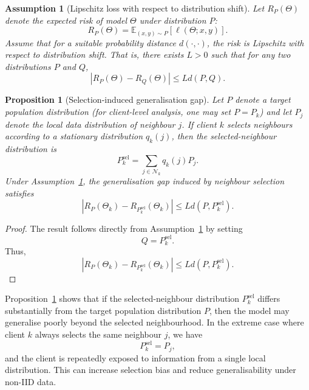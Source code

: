\documentclass[conference]{IEEEtran}
\newcommand{\rev}[1]{{\color{red}#1}}
\newtheorem{assumption}{Assumption}
\newtheorem{proposition}{Proposition}
\begin{document}
\begin{assumption}[Lipschitz loss with respect to distribution shift]
\label{ass:lipschitz_distribution}
Let $R_P(\Theta)$ denote the expected risk of model $\Theta$ under distribution $P$:
\begin{equation}
R_P(\Theta)
=
\mathbb{E}_{(x,y)\sim P}
[
\ell(\Theta;x,y)
].
    \label{eq:auto-049}
\end{equation}
Assume that for a suitable probability distance $d(\cdot,\cdot)$, the risk is Lipschitz with respect to distribution shift. That is, there exists $L>0$ such that for any two distributions $P$ and $Q$,
\begin{equation}
|R_P(\Theta)-R_Q(\Theta)|
\leq
L d(P,Q).
    \label{eq:auto-050}
\end{equation}
\end{assumption}

\begin{proposition}[Selection-induced generalisation gap]
\label{prop:selection_gap}
Let $P$ denote a target population distribution \rev{(for client-level analysis, one may set \(P=P_k\))} and let $P_j$ denote the local data distribution of neighbour $j$. If client $k$ selects neighbours according to a stationary distribution $q_k(j)$, then the selected-neighbour distribution is
\begin{equation}
P_k^{\mathrm{sel}}
=
\sum_{j\in\mathcal{N}_k}
q_k(j)P_j.
    \label{eq:auto-051}
\end{equation}
Under Assumption~\ref{ass:lipschitz_distribution}, the generalisation gap induced by neighbour selection satisfies
\begin{equation}
\left|
R_P(\Theta_k)
-
R_{P_k^{\mathrm{sel}}}(\Theta_k)
\right|
\leq
L d(P,P_k^{\mathrm{sel}}).
    \label{eq:auto-052}
\end{equation}
\end{proposition}

\begin{proof}
The result follows directly from Assumption~\ref{ass:lipschitz_distribution} by setting
\begin{equation}
Q=P_k^{\mathrm{sel}}.
    \label{eq:auto-053}
\end{equation}
Thus,
\begin{equation}
\left|
R_P(\Theta_k)
-
R_{P_k^{\mathrm{sel}}}(\Theta_k)
\right|
\leq
L d(P,P_k^{\mathrm{sel}}).
    \label{eq:auto-054}
\end{equation}
\end{proof}

Proposition~\ref{prop:selection_gap} shows that if the selected-neighbour distribution $P_k^{\mathrm{sel}}$ differs substantially from the target population distribution $P$, then the model may generalise poorly beyond the selected neighbourhood. In the extreme case where client $k$ always selects the same neighbour $j$, we have
\begin{equation}
P_k^{\mathrm{sel}}=P_j,
    \label{eq:auto-055}
\end{equation}
and the client is repeatedly exposed to information from a single local distribution. This can increase selection bias and reduce generalisability under non-IID data.
\end{document}
